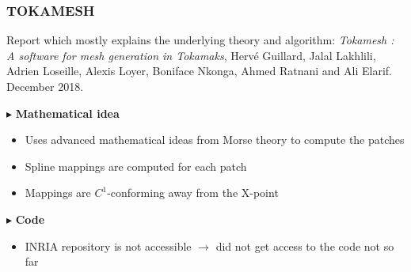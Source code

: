 \documentclass[t,10pt,a3paper]{beamer} %
\begin{document}
\begin{frame} %
\frametitle{\color{vert}\textbf{TOKAMESH}}
\footnotesize	

\vspace*{0.25cm}
Report which mostly explains the underlying theory and algorithm: 
\textit{Tokamesh : A software for mesh generation in Tokamaks}, 
Hervé Guillard, Jalal Lakhlili, Adrien Loseille, Alexis Loyer, Boniface Nkonga, Ahmed Ratnani and Ali Elarif. December 2018. 
\vspace*{0.5 cm}

{\color{vert}$\blacktriangleright$ }
\textbf{Mathematical idea}
\begin{itemize}
	\item Uses advanced mathematical ideas from Morse theory to compute the patches
	\item Spline mappings are computed for each patch
	\item Mappings are $C^1$-conforming away from the X-point
\end{itemize}

{\color{vert}$\blacktriangleright$ }
\textbf{Code}

\begin{itemize}
	\item INRIA repository is not accessible $\rightarrow$ did not get access to the code not so far
\end{itemize}

\end{frame}
\end{document}
